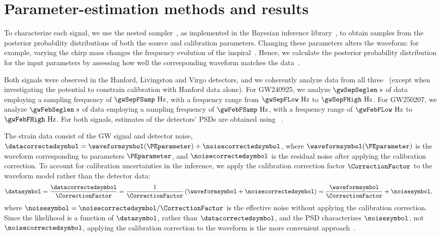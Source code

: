 \section{Parameter-estimation methods and results}

To characterize each signal, we use the \DYNESTY nested sampler~\cite{Speagle:2019ivv}, as implemented in the \BILBY Bayesian inference library~\cite{Ashton:2018jfp, Romero-Shaw:2020owr}, to obtain samples from the posterior probability distributions of both the source and calibration parameters.
Changing these parameters alters the waveform: for example, varying the chirp mass changes the frequency evolution of the inspiral~\cite{Cutler:1994ys,Blanchet:1995ez,TheLIGOScientific:2016pea}.
Hence, we calculate the posterior probability distribution for the input parameters by assessing how well the corresponding waveform matches the data~\cite{TheLIGOScientific:2016wfe,Christensen:2022bxb}.

Both signals were observed in the Hanford, Livingston and Virgo detectors, and we coherently analyze data from all three~\cite{TheLIGOScientific:2016wfe} (except when investigating the potential to constrain calibration with Hanford data alone).
For \ac{GW240925}, we analyze $\gwSepSeglen~\mathrm{s}$ of data employing a sampling frequency of $\gwSepFSamp~\mathrm{Hz}$, with a frequency range from $\gwSepFLow~\mathrm{Hz}$ to $\gwSepFHigh~\mathrm{Hz}$.
For \ac{GW250207}, we analyze $\gwFebSeglen~\mathrm{s}$ of data employing a sampling frequency of $\gwFebFSamp~\mathrm{Hz}$, with a frequency range of $\gwFebFLow~\mathrm{Hz}$ to $\gwFebFHigh~\mathrm{Hz}$.
For both signals, estimates of the detectors' \acp{PSD} are obtained using \BAYESWAVE~\cite{Cornish:2014kda,Littenberg:2014oda,Cornish:2020dwh}.

The strain data consist of the \ac{GW} signal and detector noise, $\datacorrectedsymbol = \waveformsymbol(\PEparameter) + \noisecorrectedsymbol$, where $\waveformsymbol(\PEparameter)$ is the waveform corresponding to parameters $\PEparameter$, and $\noisecorrectedsymbol$ is the residual noise after applying the calibration correction.
To account for calibration uncertainties in the inference, we apply the calibration correction factor $\CorrectionFactor$ to the waveform model rather than the detector data:
\begin{align}
	\datasymbol &= \frac{\datacorrectedsymbol}{\CorrectionFactor} = \frac{1}{\CorrectionFactor}\left(\waveformsymbol + \noisecorrectedsymbol\right) = \frac{\waveformsymbol}{\CorrectionFactor} + \noisesymbol,
\end{align}
where $\noisesymbol = \noisecorrectedsymbol / \CorrectionFactor$ is the effective noise without applying the calibration correction.
Since the likelihood is a function of $\datasymbol$, rather than $\datacorrectedsymbol$, and the \ac{PSD} characterizes $\noisesymbol$, not $\noisecorrectedsymbol$, applying the calibration correction to the waveform is the more convenient approach~\cite{LIGOScientific:2025yae}.

